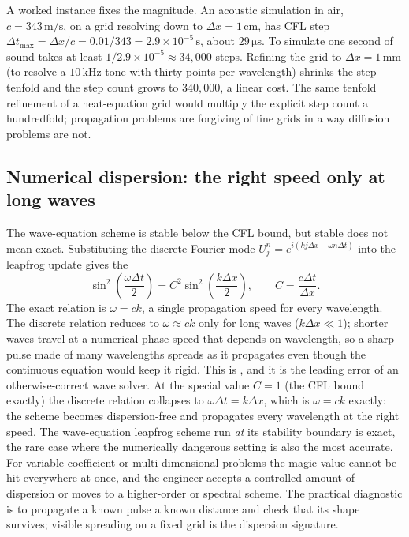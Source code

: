 A worked instance fixes the magnitude. An acoustic simulation in
air, $c = 343\,\si{\meter\per\second}$, on a grid resolving down to
$\Delta x = 1\,\si{\centi\meter}$, has CFL step $\Delta t_{\max} =
\Delta x/c = 0.01/343 = 2.9 \times 10^{-5}\,\si{\second}$, about
$29\,\si{\micro\second}$. To simulate one second of sound takes at
least $1/2.9 \times 10^{-5} \approx 34{,}000$ steps. Refining the
grid to $\Delta x = 1\,\si{\milli\meter}$ (to resolve a
$10\,\si{\kilo\hertz}$ tone with thirty points per wavelength)
shrinks the step tenfold and the step count grows to $340{,}000$,
a linear cost. The same tenfold refinement of a heat-equation grid
would multiply the explicit step count a hundredfold; propagation
problems are forgiving of fine grids in a way diffusion problems
are not.

\subsection{Numerical dispersion: the right speed only at long waves}

The wave-equation scheme is stable below the CFL bound, but stable
does not mean exact. Substituting the discrete Fourier mode
$U_{j}^{n} = e^{i(kj\Delta x - \omega n\Delta t)}$ into the
leapfrog update gives the 
\[
\sin^{2}\!\left(\frac{\omega\Delta t}{2}\right) = C^{2}\sin^{2}\!\left(\frac{k\Delta x}{2}\right), \qquad C = \frac{c\Delta t}{\Delta x}.
\]
The exact relation is $\omega = c k$, a single propagation speed
for every wavelength. The discrete relation reduces to $\omega
\approx c k$ only for long waves ($k\Delta x \ll 1$); shorter waves
travel at a numerical phase speed that depends on wavelength, so a
sharp pulse made of many wavelengths spreads as it propagates even
though the continuous equation would keep it rigid. This is
, and it is the leading error of an
otherwise-correct wave solver. At the special value $C = 1$ (the
CFL bound exactly) the discrete relation collapses to $\omega\Delta
t = k\Delta x$, which is $\omega = ck$ exactly: the scheme becomes
dispersion-free and propagates every wavelength at the right speed.
The wave-equation leapfrog scheme run \emph{at} its stability
boundary is exact, the rare case where the numerically dangerous
setting is also the most accurate. For variable-coefficient or
multi-dimensional problems the magic value cannot be hit everywhere
at once, and the engineer accepts a controlled amount of dispersion
or moves to a higher-order or spectral scheme. The practical
diagnostic is to propagate a known pulse a known distance and check
that its shape survives; visible spreading on a fixed grid is the
dispersion signature.

